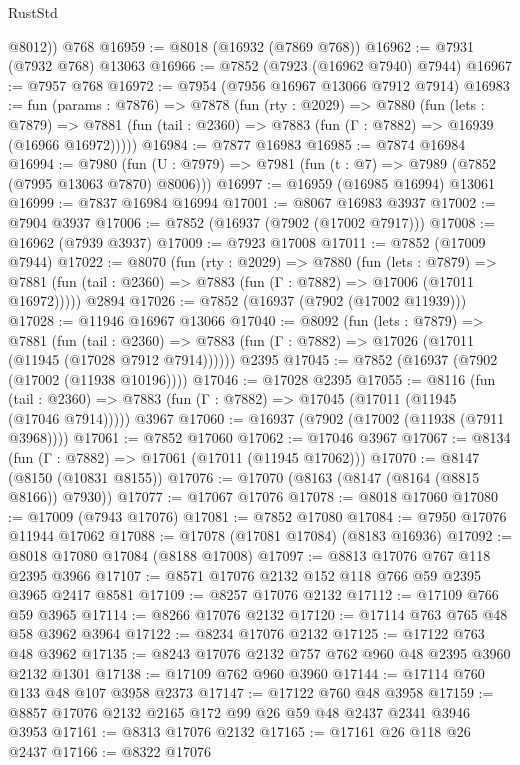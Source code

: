 \begin{lexlean}{RustStd}
\begin{coremodule}
        @8012))
    @768
@16959 := @8018 (@16932 (@7869 @768))
@16962 := @7931 (@7932 @768) @13063
@16966 := @7852 (@7923 (@16962 @7940) @7944)
@16967 := @7957 @768
@16972 := @7954 (@7956 @16967 @13066 @7912 @7914)
@16983 := fun (params : @7876) =>
  @7878
    (fun (rty : @2029) =>
    @7880
      (fun (lets : @7879) =>
      @7881 (fun (tail : @2360) => @7883 (fun (Γ : @7882) => @16939 (@16966 @16972)))))
@16984 := @7877 @16983
@16985 := @7874 @16984
@16994 := @7980
    (fun (U : @7979) => @7981 (fun (t : @7) => @7989 (@7852 (@7995 @13063 @7870) @8006)))
@16997 := @16959 (@16985 @16994) @13061
@16999 := @7837 @16984 @16994
@17001 := @8067 @16983 @3937
@17002 := @7904 @3937
@17006 := @7852 (@16937 (@7902 (@17002 @7917)))
@17008 := @16962 (@7939 @3937)
@17009 := @7923 @17008
@17011 := @7852 (@17009 @7944)
@17022 := @8070
    (fun (rty : @2029) =>
    @7880
      (fun (lets : @7879) =>
      @7881 (fun (tail : @2360) => @7883 (fun (Γ : @7882) => @17006 (@17011 @16972)))))
    @2894
@17026 := @7852 (@16937 (@7902 (@17002 @11939)))
@17028 := @11946 @16967 @13066
@17040 := @8092
    (fun (lets : @7879) =>
    @7881
      (fun (tail : @2360) =>
      @7883 (fun (Γ : @7882) => @17026 (@17011 (@11945 (@17028 @7912 @7914))))))
    @2395
@17045 := @7852 (@16937 (@7902 (@17002 (@11938 @10196))))
@17046 := @17028 @2395
@17055 := @8116
    (fun (tail : @2360) => @7883 (fun (Γ : @7882) => @17045 (@17011 (@11945 (@17046 @7914)))))
    @3967
@17060 := @16937 (@7902 (@17002 (@11938 (@7911 @3968))))
@17061 := @7852 @17060
@17062 := @17046 @3967
@17067 := @8134 (fun (Γ : @7882) => @17061 (@17011 (@11945 @17062)))
@17070 := @8147 (@8150 (@10831 @8155))
@17076 := @17070 (@8163 (@8147 (@8164 (@8815 @8166)) @7930))
@17077 := @17067 @17076
@17078 := @8018 @17060
@17080 := @17009 (@7943 @17076)
@17081 := @7852 @17080
@17084 := @7950 @17076 @11944 @17062
@17088 := @17078 (@17081 @17084) (@8183 @16936)
@17092 := @8018 @17080 @17084 (@8188 @17008)
@17097 := @8813 @17076 @767 @118 @2395 @3966
@17107 := @8571 @17076 @2132 @152 @118 @766 @59 @2395 @3965 @2417 @8581
@17109 := @8257 @17076 @2132
@17112 := @17109 @766 @59 @3965
@17114 := @8266 @17076 @2132
@17120 := @17114 @763 @765 @48 @58 @3962 @3964
@17122 := @8234 @17076 @2132
@17125 := @17122 @763 @48 @3962
@17135 := @8243 @17076 @2132 @757 @762 @960 @48 @2395 @3960 @2132 @1301
@17138 := @17109 @762 @960 @3960
@17144 := @17114 @760 @133 @48 @107 @3958 @2373
@17147 := @17122 @760 @48 @3958
@17159 := @8857 @17076 @2132 @2165 @172 @99 @26 @59 @48 @2437 @2341 @3946 @3953
@17161 := @8313 @17076 @2132
@17165 := @17161 @26 @118 @26 @2437
@17166 := @8322 @17076

\end{coremodule}
\end{lexlean}
